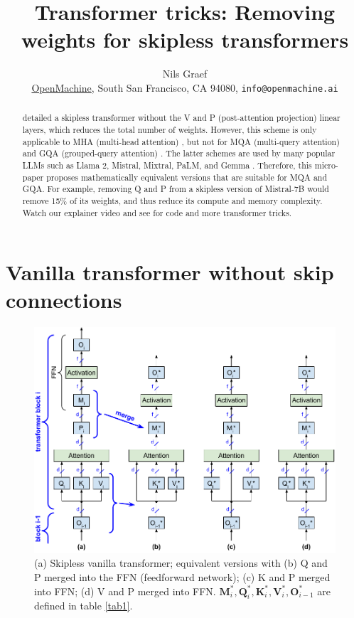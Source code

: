 \documentclass{article}
\title{Transformer tricks: Removing weights for skipless transformers}
\author{Nils Graef \\ \href{https://openmachine.ai}{OpenMachine},
  South San Francisco, CA 94080, \texttt{info@openmachine.ai}}
\newcommand{\mat}[1]{\mathbf{#1}}  %
\def\Q{\mat{Q}_i}
\def\K{\mat{K}_i}
\def\V{\mat{V}_i}
\def\O{\mat{O}_{i-1}}
\def\M{\mat{M}_i}
\begin{document}
 \maketitle

\begin{abstract}
\citet{simplified} detailed a skipless transformer without the V and P (post-attention projection) linear layers, which reduces the total number of weights. However, this scheme is only applicable to MHA (multi-head attention) \cite{vanilla}, but not for MQA (multi-query attention) \cite{MQA} and GQA (grouped-query attention) \cite{GQA}. The latter schemes are used by many popular LLMs such as Llama 2, Mistral, Mixtral, PaLM, and Gemma \cite{Llama2, mistral, mixtral, PaLM, gemma}. Therefore, this micro-paper \cite{micro-paper} proposes mathematically equivalent versions that are suitable for MQA and GQA. For example, removing Q and P from a skipless version of Mistral-7B would remove 15\% of its weights, and thus reduce its compute and memory complexity. Watch our explainer video \citep{remove-video} and see \citep{tricks, slimAttn, flashNorm, precompute} for code and more transformer tricks.
\end{abstract}

\section{Vanilla transformer without skip connections}

\begin{figure}[h!] \centering %
  \includegraphics[scale=0.90]{../doc/fig/removeWeights_fig1.pdf}
  \caption{(a) Skipless vanilla transformer; equivalent versions with (b) Q and P merged into the FFN (feedforward network); (c) K and P merged into FFN; (d) V and P merged into FFN. $\M^*, \Q^*, \K^*, \V^*, \O^*$ are defined in table \ref{tab1}.}
\label{fig1} \end{figure}
\end{document}
